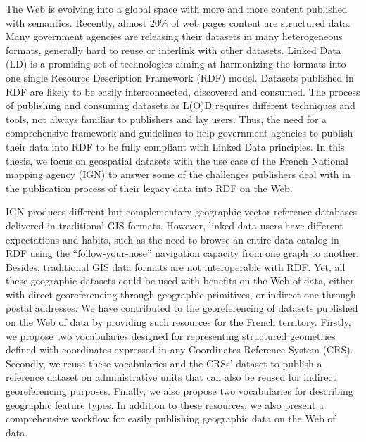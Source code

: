 The Web is evolving into a global space with more and more content published with semantics. Recently, almost 20\% of web pages content are structured data. Many government agencies are releasing their datasets in many heterogeneous formats, generally hard to reuse or interlink with other datasets. Linked Data (LD) is a promising set of technologies aiming at harmonizing the formats into one single Resource Description Framework (RDF) model. Datasets published in RDF are likely to be easily interconnected, discovered and consumed. The process of publishing and consuming datasets as L(O)D requires different techniques and tools, not always familiar to publishers and lay users. Thus, the need for a comprehensive framework and guidelines to help government agencies to publish their data into RDF to be fully compliant with Linked Data principles. In this thesis, we focus on geospatial datasets with the use case of the French National mapping agency (IGN) to answer some of the challenges publishers deal with in the publication process of their legacy data into RDF on the Web. 

  
IGN produces different but complementary geographic vector reference databases delivered in traditional GIS formats. However, linked data users have different expectations and habits, such as the need to browse an entire data catalog in RDF using the ``follow-your-nose'' navigation capacity from one graph to another. Besides, traditional GIS data formats are not interoperable with RDF. Yet, all these geographic datasets could be used with benefits on the Web of data, either with direct georeferencing through geographic primitives, or indirect one through postal addresses.
We have contributed to the georeferencing of datasets published on the Web of data by providing such resources for the French territory. Firstly, we propose two vocabularies designed for representing structured geometries defined with coordinates expressed in any Coordinates Reference System (CRS). Secondly, we reuse these vocabularies and the CRSs' dataset to publish a reference dataset on administrative units that can also be reused for indirect georeferencing purposes. Finally, we also propose two vocabularies for describing geographic feature types. In addition to these resources, we also present a comprehensive workflow for easily publishing geographic data on the Web of data.


